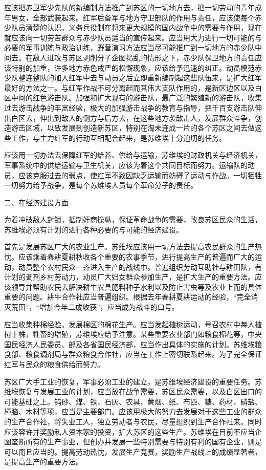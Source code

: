 应该把赤卫军少先队的新编制方法推广到苏区的一切地方去，把一切劳动的青年成年男女，全部武装起来。红军后备军与地方守卫部队的作用与责任，应该使每个赤少队员清楚的认识。义务兵役制在将来更大规模的国内战争中的需要与作用，现在就应该向一切劳苦群众与赤少队员适当的宣传起来。应当用大力进行一切可能的与必要的军事训练与政治训练，野营演习方法应当尽可能推广到一切地方的赤少队中间去。在敌人进攻与苏区剥削分子企图捣乱的情形之下，赤少队保卫地方的责任应该特别的加重，许多地方赤色戒严的松懈现象，应该给予迅速的纠正。动员模范赤少队整连整队的加入红军中去与动员之后立即重新编制起这些队伍来，是扩大红军最好的方法之一。与红军作战不可分离起而其伟大支队作用的，是新区边区以及白区中间的红色游击队。加强和扩大现有的游击队，最广泛的繁殖新的游击队，收集过去游击战争的丰富经验，极大的加强游击战争的教育与指导，把千百支游击队伸出白区去，伸出到敌人的侧方与后方去，在这些地方袭敌击人，发展群众斗争，创造游击区域，以致发展到创造新苏区，特别在淘未连成一片的各个苏区之间去做这些工作，与主力红军的行动互相配合起来，是苏维埃十分迫切的任务。

应该用一切办法去保障红军的给养、供给与运输，苏维埃的财政机关与经济机关，军事系统中的供给运输与卫生机关，应该为着这个共同目标而努力。运输队的动员，应该克服过去的弱点，使红军不致因缺乏运输而妨碍了运动与作战。一切牺牲一切努力给予战争，是每个苏维埃人员每个革命分子的责任。

二、在经济建设方面

为着冲破敌人封锁，抵制奸商操纵，保证革命战争的需要，改良苏区民众的生活，苏维埃必须有计划的进行各种必要的与可能的经济建设。

首先是发展苏区广大的农业生产。苏维埃应该用一切方法去提高农民群众的生产热忱。应该乘着春耕夏耕秋收各个重要的农事季节，进行提高生产的普遍而广大的运动，动员整个农村民众一齐进入生产的战线中。普遍组织劳动互助社与耕田队，有计划的调剂乡村劳动力，动员广大妇女群众参加生产，是扩大生产的重要方法。应该领导并帮助农民去解决耕牛农具肥料种子水利以及防止害虫等及农业上而的具体重要的问题。耕牛合作社应当普遍组织。根据去年春耕夏耕运动的经验，“完全消灭荒田”，“增加今年二成收获”，应当成为战斗的口号。

应当收集种棉经验。发展棉区的棉花生产。应当发起植树运动，号召农村中每人植树十株，牲畜的增殖，苏维埃应给予注意。某些重要农业部门如粮食棉花等，中央国民经济人民委员、部及各省国民经济部，应当作出具体的实施的计划。苏维埃粮食部、粮食调剂局与群众粮食合作社，应当在工作上密切联系起来。为了完全保证红军与民众的粮食供给而努力。

苏区广大手工业的恢复，军事必须工业的建立，是苏维埃经济建设的重要任务。苏维埃恢复与发展工业的计划，应当放在战争需要，苏区民众需要，以及白区出口的可能基础之上。钨砂、煤、铁、石灰、农具、黄烟、纸、布匹、糖、药材、硝盐、樟脑、木材等项，应当是主要部门。应该用极大的努力去发展对于这些工业的群众的生产合作社，将失业工人，独立劳动者与农民，尽量组织到生产合作社来。同时应该容许并奖励私人资本家的投资，扩大苏区的这些生产。苏维埃在目前不应当企图垄断所有的生产事业，但创办并发展一些特别需要与特别有利的国有企业，则是可以而且应当的。提高劳动热忱，发展生产竞赛，奖励生产战线上的成绩显著者，是提高生产的重要方法。

